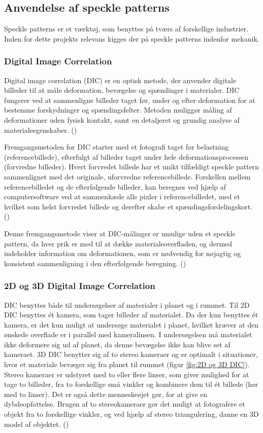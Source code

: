 \subsection{Anvendelse af speckle patterns} 
Speckle patterns er et værktøj, som benyttes på tværs af forskellige industrier. Inden for dette projekts relevans kigges der på speckle patterns indenfor mekanik. 

\subsubsection{Digital Image Correlation} Digital image correlation (DIC) er en optisk metode, der anvender digitale billeder til at måle deformation, bevægelse og spændinger i materialer. DIC fungerer ved at sammenligne billeder taget før, under og efter deformation for at bestemme forskydninger og spændingsfelter. Metoden muliggør måling af deformationer uden fysisk kontakt, samt en detaljeret og grundig analyse af materialeegenskaber. (\cite{Zaya2023ApplicationReview})

Fremgangsmetoden for DIC starter med et fotografi taget før belastning (referencebillede), efterfulgt af billeder taget under hele deformationsprocessen (forvredne billeder). Hvert forvredet billede har et unikt tilfældigt speckle pattern sammenlignet med det originale, uforvredne referencebillede. Forskellen mellem referencebilledet og de efterfølgende billeder, kan beregnes ved hjælp af computersoftware ved at sammenkæde alle pixler i referencebilledet, med et hvilket som helst forvredet billede og derefter skabe et spændingsfordelingskort. (\cite{Zaya2023ApplicationReview})

Denne fremgangsmetode viser at DIC-målinger er umulige uden et speckle pattern, da hver prik er med til at dække materialeoverfladen, og dermed indeholder information om deformationen, som er nødvendig for nøjagtig og konsistent sammenligning i den efterfølgende beregning. (\cite{Zaya2023ApplicationReview})

\subsubsection{2D og 3D Digital Image Correlation}
DIC benyttes både til undersøgelser af materialer i planet og i rummet. Til 2D DIC benyttes ét kamera, som tager billeder af materialet. Da der kun benyttes ét kamera, er det kun muligt at undersøge materialet i planet, hvilket kræver at den ønskede overflade er i parallel med kameralinsen. I undersøgelsen må materialet ikke deformere sig ud af planet, da denne bevægelse ikke kan blive set af kameraet. 3D DIC benytter sig af to stereo kameraer og er optimalt i situationer, hvor et materiale bevæger sig fra planet til rummet (figur \ref{fig:2D og 3D DIC}). Stereo kameraer er udstyret med to eller flere linser, som giver mulighed for at tage to  billeder, fra to forskellige små vinkler og kombinere dem til ét billede (her med to linser). Det er også dette menneskeøjet gør, for at give en dybdeopfattelse. Brugen af to stereokameraer gør det muligt at fotografere et objekt fra to forskellige vinkler, og ved hjælp af stereo triangulering, danne en 3D model af objektet. (\cite{Byrne2020DigitalSoftware})

